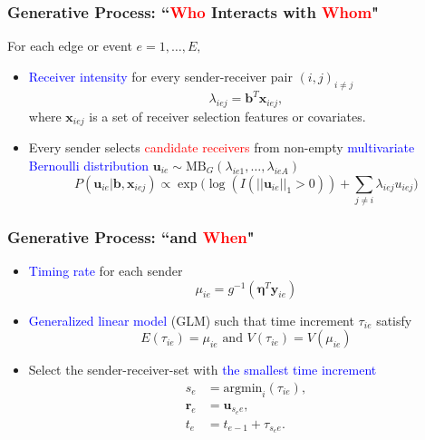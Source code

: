 \documentclass{beamer}
\begin{document}
\begin{frame}
	\frametitle{Generative Process: ``\textcolor{red}{Who} Interacts with \textcolor{red}{Whom}"}
For each edge or event $e = 1,\ldots, E,$ 	\normalsize\vspace{0.15cm}
	\begin{itemize}
		\item \textcolor{blue}{Receiver intensity} for every sender-receiver pair $(i, j)_{i\neq j}$
		\begin{equation*}
		\lambda_{iej} = \boldsymbol{b}^T \boldsymbol{x}_{iej},
		\end{equation*}
		where $\boldsymbol{x}_{iej}$ is a set of receiver selection features or covariates. \vspace{0.15cm}
		\item Every sender selects \textcolor{red}{candidate receivers} from non-empty \textcolor{blue}{multivariate Bernoulli distribution} $\boldsymbol{u}_{ie} \sim \mbox{MB}_G ({\lambda}_{ie1},\ldots, {\lambda}_{ieA})$
				\begin{equation*}
			P(\boldsymbol{u}_{ie}|\boldsymbol{b}, \boldsymbol{x}_{iej}) \propto \exp\Big(\log(I(||\boldsymbol{u}_{ie}||_1 > 0))+\sum_{j\neq i} \lambda_{iej}u_{iej}\Big)
				\end{equation*}
	\end{itemize}
	
\end{frame}
\begin{frame}
	\frametitle{Generative Process: ``and \textcolor{red}{When}"}
		\begin{itemize}
			\item \textcolor{blue}{Timing rate} for each sender
			\begin{equation*}
			\mu_{ie} = g^{-1}(\boldsymbol{\eta}^T \boldsymbol{y}_{ie})
			\end{equation*}
			\item \textcolor{blue}{Generalized linear model} (GLM) such that time increment $\tau_{ie}$ satisfy
			\begin{equation*}
			E(\tau_{ie}) = 	\mu_{ie} \mbox{ and } V(\tau_{ie}) = V(	\mu_{ie})
			\end{equation*}
			\item Select the sender-receiver-set with \textcolor{blue}{the smallest time increment}
						\begin{equation*}
						\begin{aligned}
						s_e &= \mbox{argmin}_{i}(\tau_{ie}),\\
						\boldsymbol{r}_e &= \boldsymbol{u}_{s_e e},\\
						t_e &=t_{e-1} + \tau_{s_e e}.
						\end{aligned}
						\end{equation*}
		\end{itemize}
	\end{frame}
\end{document}
